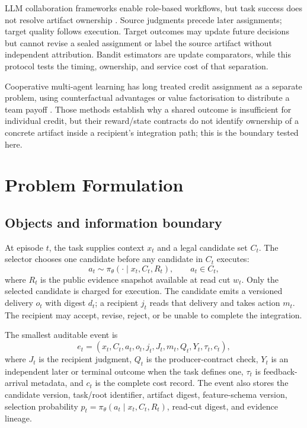 \documentclass[sigconf,anonymous]{aamas}
\begin{document}
LLM collaboration frameworks enable role-based workflows, but task success does not resolve artifact ownership \cite{wu2023autogen,metagpt2024,agentverse2024,zhuge2024gptswarm}. Source judgments precede later assignments; target quality follows execution. Target outcomes may update future decisions but cannot revise a sealed assignment or label the source artifact without independent attribution. Bandit estimators are update comparators, while this protocol tests the timing, ownership, and service cost of that separation.

Cooperative multi-agent learning has long treated credit assignment as a separate problem, using counterfactual advantages or value factorisation to distribute a team payoff \cite{foerster2018coma,rashid2020qmix}. Those methods establish why a shared outcome is insufficient for individual credit, but their reward/state contracts do not identify ownership of a concrete artifact inside a recipient's integration path; this is the boundary tested here.

\section{Problem Formulation}
\label{sec:problem}

\subsection{Objects and information boundary}
At episode $t$, the task supplies context $x_t$ and a legal candidate set $C_t$. The selector chooses one candidate before any candidate in $C_t$ executes:
\begin{equation}
 a_t\sim\pi_{\theta}(\cdot\mid x_t,C_t,R_t),\qquad a_t\in C_t,
 \label{eq:choice}
\end{equation}
where $R_t$ is the public evidence snapshot available at read cut $w_t$. Only the selected candidate is charged for execution. The candidate emits a versioned delivery $o_t$ with digest $d_t$; a recipient $j_t$ reads that delivery and takes action $m_t$. The recipient may accept, revise, reject, or be unable to complete the integration.

The smallest auditable event is
\begin{equation}
 e_t=(x_t,C_t,a_t,o_t,j_t,J_t,m_t,Q_t,Y_t,\tau_t,c_t),
 \label{eq:event}
\end{equation}
where $J_t$ is the recipient judgment, $Q_t$ is the producer-contract check, $Y_t$ is an independent later or terminal outcome when the task defines one, $\tau_t$ is feedback-arrival metadata, and $c_t$ is the complete cost record. The event also stores the candidate version, task/root identifier, artifact digest, feature-schema version, selection probability $p_t=\pi_\theta(a_t\mid x_t,C_t,R_t)$, read-cut digest, and evidence lineage.
\end{document}
